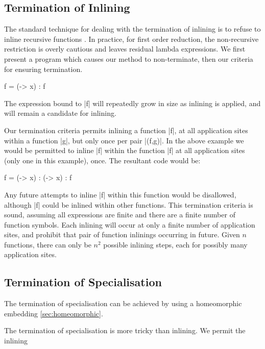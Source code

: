 \documentclass[preprint]{sigplanconf}
\begin{document}
\subsection{Termination of Inlining}

The standard technique for dealing with the termination of inlining is to refuse to inline recursive functions \cite{spj:inlining}. In practice, for first order reduction, the non-recursive restriction is overly cautious and leaves residual lambda expressions. We first present a program which causes our method to non-terminate, then our criteria for ensuring termination.

\begin{example}
\begin{code}
f = (\x -> x) : f
\end{code}

The expression bound to |f| will repeatedly grow in size as inlining is applied, and will remain a candidate for inlining.
\end{example}

Our termination criteria permits inlining a function |f|, at all application sites within a function |g|, but only once per pair |(f,g)|. In the above example we would be permitted to inline |f| within the function |f| at all application sites (only one in this example), once. The resultant code would be:

\begin{code}
f = (\x -> x) : (\x -> x) : f
\end{code}

Any future attempts to inline |f| within this function would be disallowed, although |f| could be inlined within other functions. This termination criteria is sound, assuming all expressions are finite and there are a finite number of function symbols. Each inlining will occur at only a finite number of application sites, and prohibit that pair of function inlinings occurring in future. Given $n$ functions, there can only be $n^2$ possible inlining steps, each for possibly many application sites.


\subsection{Termination of Specialisation}

The termination of specialisation can be achieved by using a homeomorphic embedding \ref{sec:homeomorphic}.

The termination of specialisation is more tricky than inlining. We permit the inlining
\end{document}
